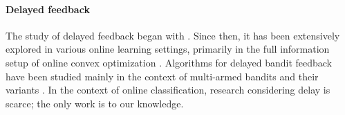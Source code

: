 \paragraph{Delayed feedback}
The study of delayed feedback began with \citet{Weinberger_2002_delay}. 
Since then, it has been extensively explored in various online learning settings, primarily in the full information setup of online convex optimization \citep{Mesterharm05online,joulani13online,joulani16delay,pmlr-v139-flaspohler21a}. 
Algorithms for delayed bandit feedback have been studied mainly in the context of multi-armed bandits and their variants \citep{cesabianchi16delay,zimmert20optimal,ito20delay,masoudian22best,hoeven23unified}. In the context of online classification, research considering delay is scarce; the only work is \citet{manwani2022delaytronefficientlearningmulticlass} to our knowledge.


